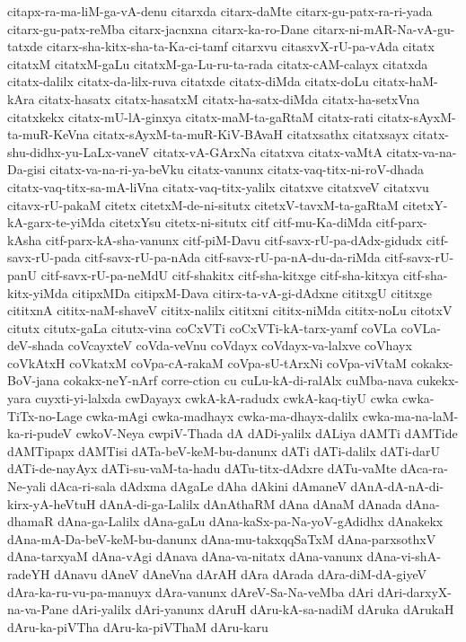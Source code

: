 {citapx-ra-ma-liM-ga-vA-denu
citarxda
citarx-daMte
citarx-gu-patx-ra-ri-yada
citarx-gu-patx-reMba
citarx-jacnxna
citarx-ka-ro-Dane
citarx-ni-mAR-Na-vA-gu-tatxde
citarx-sha-kitx-sha-ta-Ka-ci-tamf
citarxvu
citasxvX-rU-pa-vAda
citatx
citatxM
citatxM-gaLu
citatxM-ga-Lu-ru-ta-rada
citatx-cAM-calayx
citatxda
citatx-dalilx
citatx-da-lilx-ruva
citatxde
citatx-diMda
citatx-doLu
citatx-haM-kAra
citatx-hasatx
citatx-hasatxM
citatx-ha-satx-diMda
citatx-ha-setxVna
citatxkekx
citatx-mU-lA-ginxya
citatx-maM-ta-gaRtaM
citatx-rati
citatx-sAyxM-ta-muR-KeVna
citatx-sAyxM-ta-muR-KiV-BAvaH
citatxsathx
citatxsayx
citatx-shu-didhx-yu-LaLx-vaneV
citatx-vA-GArxNa
citatxva
citatx-vaMtA
citatx-va-na-Da-gisi
citatx-va-na-ri-ya-beVku
citatx-vanunx
citatx-vaq-titx-ni-roV-dhada
citatx-vaq-titx-sa-mA-liVna
citatx-vaq-titx-yalilx
citatxve
citatxveV
citatxvu
citavx-rU-pakaM
citetx
citetxM-de-ni-situtx
citetxV-tavxM-ta-gaRtaM
citetxY-kA-garx-te-yiMda
citetxYsu
citetx-ni-situtx
citf
citf-mu-Ka-diMda
citf-parx-kAsha
citf-parx-kA-sha-vanunx
citf-piM-Davu
citf-savx-rU-pa-dAdx-gidudx
citf-savx-rU-pada
citf-savx-rU-pa-nAda
citf-savx-rU-pa-nA-du-da-riMda
citf-savx-rU-panU
citf-savx-rU-pa-neMdU
citf-shakitx
citf-sha-kitxge
citf-sha-kitxya
citf-sha-kitx-yiMda
citipxMDa
citipxM-Dava
citirx-ta-vA-gi-dAdxne
cititxgU
cititxge
cititxnA
cititx-naM-shaveV
cititx-nalilx
cititxni
cititx-niMda
cititx-noLu
citotxV
citutx
citutx-gaLa
citutx-vina
coCxVTi
coCxVTi-kA-tarx-yamf
coVLa
coVLa-deV-shada
coVcayxteV
coVda-veVnu
coVdayx
coVdayx-va-lalxve
coVhayx
coVkAtxH
coVkatxM
coVpa-cA-rakaM
coVpa-sU-tArxNi
coVpa-viVtaM
cokakx-BoV-jana
cokakx-neY-nArf
corre-ction
cu
cuLu-kA-di-ralAlx
cuMba-nava
cukekx-yara
cuyxti-yi-lalxda
cwDayayx
cwkA-kA-radudx
cwkA-kaq-tiyU
cwka
cwka-TiTx-no-Lage
cwka-mAgi
cwka-madhayx
cwka-ma-dhayx-dalilx
cwka-ma-na-laM-ka-ri-pudeV
cwkoV-Neya
cwpiV-Thada
dA
dADi-yalilx
dALiya
dAMTi
dAMTide
dAMTipapx
dAMTisi
dATa-beV-keM-bu-danunx
dATi
dATi-dalilx
dATi-darU
dATi-de-nayAyx
dATi-su-vaM-ta-hadu
dATu-titx-dAdxre
dATu-vaMte
dAca-ra-Ne-yali
dAca-ri-sala
dAdxma
dAgaLe
dAha
dAkini
dAmaneV
dAnA-dA-nA-di-kirx-yA-heVtuH
dAnA-di-ga-Lalilx
dAnAthaRM
dAna
dAnaM
dAnada
dAna-dhamaR
dAna-ga-Lalilx
dAna-gaLu
dAna-kaSx-pa-Na-yoV-gAdidhx
dAnakekx
dAna-mA-Da-beV-keM-bu-danunx
dAna-mu-takxqqSaTxM
dAna-parxsothxV
dAna-tarxyaM
dAna-vAgi
dAnava
dAna-va-nitatx
dAna-vanunx
dAna-vi-shA-radeYH
dAnavu
dAneV
dAneVna
dArAH
dAra
dArada
dAra-diM-dA-giyeV
dAra-ka-ru-vu-pa-manuyx
dAra-vanunx
dAreV-Sa-Na-veMba
dAri
dAri-darxyX-na-va-Pane
dAri-yalilx
dAri-yanunx
dAruH
dAru-kA-sa-nadiM
dAruka
dArukaH
dAru-ka-piVTha
dAru-ka-piVThaM
dAru-karu
}

